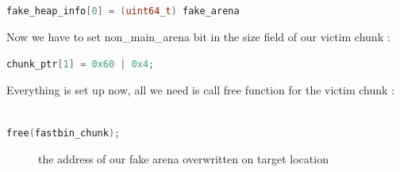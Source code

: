 \documentclass{masterthesis}
\begin{document}
\begin{lstlisting}[language=c,frame=tlrb]

fake_heap_info[0] = (uint64_t) fake_arena
\end{lstlisting}
Now we have to set non\_main\_arena bit in the size field of our victim chunk :
\begin{lstlisting}[language=c,frame=tlrb]
chunk_ptr[1] = 0x60 | 0x4;
\end{lstlisting}
Everything is set up now, all we need is call free function for the victim chunk :
\begin{lstlisting}[language=c,frame=tlrb]

free(fastbin_chunk); 
\end{lstlisting}

\begin{figure}[h!]
  \caption{the address of our fake arena overwritten on target location}
\end{figure}
\end{document}
